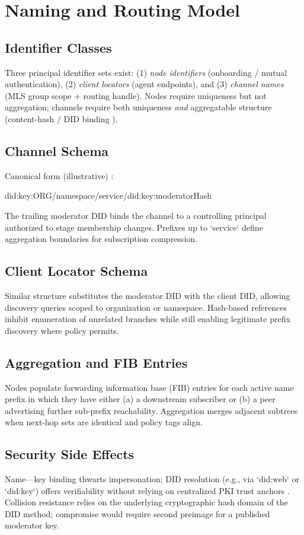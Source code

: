 \documentclass{article}
\theoremstyle{definition}
\theoremstyle{remark}
\begin{document}
\section{Naming and Routing Model}\label{sec:naming}
\subsection{Identifier Classes}
Three principal identifier sets exist: (1) \emph{node identifiers} (onboarding / mutual authentication), (2) \emph{client locators} (agent endpoints), and (3) \emph{channel names} (MLS group scope + routing handle). Nodes require uniqueness but not aggregation; channels require both uniqueness \emph{and} aggregatable structure (content-hash / DID binding \citep{rfc6920,didcore}).
\subsection{Channel Schema}
Canonical form (illustrative) \citep{didcore,didkey}:
\begin{center}\ttfamily did:key:ORG/namespace/service/did:key:moderatorHash\end{center}
The trailing moderator DID binds the channel to a controlling principal
authorized to stage membership changes. Prefixes up to `service` define
aggregation boundaries for subscription compression.
\subsection{Client Locator Schema}
Similar structure substitutes the moderator DID with the client DID, allowing
discovery queries scoped to organization or namespace. Hash-based references
inhibit enumeration of unrelated branches while still enabling legitimate
prefix discovery where policy permits.
\subsection{Aggregation and FIB Entries}
Nodes populate forwarding information base (FIB) entries for each active name
prefix in which they have either (a) a downstream subscriber or (b) a peer
advertising further sub-prefix reachability. Aggregation merges adjacent
subtrees when next-hop sets are identical and policy tags align.
\subsection{Security Side Effects}
Name---key binding thwarts impersonation; DID resolution (e.g., via `did:web`
or `did:key`) offers verifiability without relying on centralized PKI trust
anchors \citep{didweb,didkey}. Collision resistance relies on the underlying
cryptographic hash domain of the DID method; compromise would require second
preimage for a published moderator key.
\end{document}
